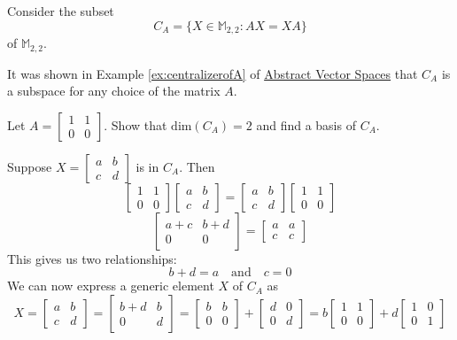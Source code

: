 \documentclass{ximera}
\begin{document}
\begin{example}\label{ex:CAbasis}
Consider the subset
\begin{equation*}
C_A = \{X \in\mathbb{M}_{2,2} : AX = XA \}
\end{equation*}
of $\mathbb{M}_{2,2}$. 

It was shown in Example \ref{ex:centralizerofA} of \href{https://ximera.osu.edu/linearalgebradzv3/LinearAlgebraInteractiveIntro/VSP-0050/main}{Abstract Vector Spaces} that $C_A$ is a subspace for any choice of the matrix $A$.

Let $A = 
\begin{bmatrix}
1 & 1 \\
0 & 0
\end{bmatrix}$.
Show that $\mbox{dim}(C_A) = 2$ and find a basis of $C_A$.

\begin{explanation}
 Suppose $X = 
\begin{bmatrix}
a & b \\
c & d
\end{bmatrix}$
 is in $C_A$.  
 Then
 $$\begin{bmatrix}1&1\\0&0\end{bmatrix}\begin{bmatrix}a&b\\c&d\end{bmatrix}=\begin{bmatrix}a&b\\c&d\end{bmatrix}\begin{bmatrix}1&1\\0&0\end{bmatrix}$$
 $$\begin{bmatrix}a+c&b+d\\0&0\end{bmatrix}=\begin{bmatrix}a&a\\c&c\end{bmatrix}$$
 This gives us two relationships:  
 $$b+d=a\quad\text{and}\quad c=0$$
 We can now express a generic element $X$ of $C_A$ as
 $$X=\begin{bmatrix}a&b\\c&d\end{bmatrix}=\begin{bmatrix}b+d&b\\0&d\end{bmatrix}=\begin{bmatrix}b&b\\0&0\end{bmatrix}+\begin{bmatrix}d&0\\0&d\end{bmatrix}=b\begin{bmatrix}1&1\\0&0\end{bmatrix}+d\begin{bmatrix}1&0\\0&1\end{bmatrix}$$
 

\end{explanation}
\end{example}
\end{document}
